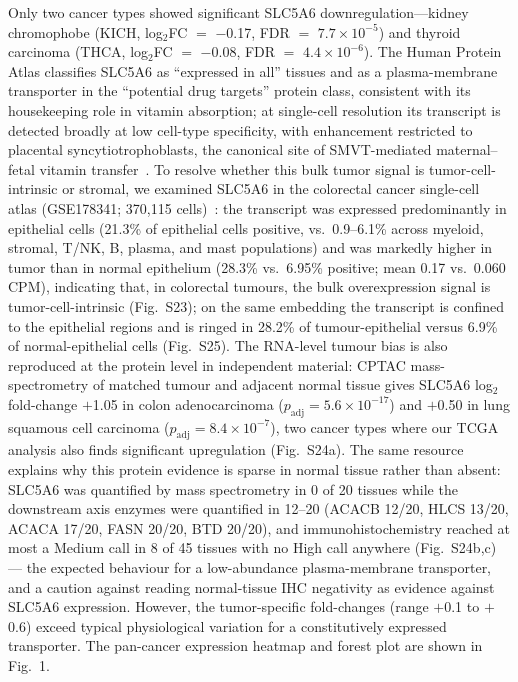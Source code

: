 \documentclass[pdflatex,sn-nature]{sn-jnl}
\begin{document}
Only two cancer types showed significant SLC5A6 downregulation---kidney chromophobe (KICH, log$_2$FC $=$ $-$0.17, FDR $=$ $7.7\times10^{-5}$) and thyroid carcinoma (THCA, log$_2$FC $=$ $-$0.08, FDR $=$ $4.4\times10^{-6}$). The Human Protein Atlas classifies SLC5A6 as ``expressed in all'' tissues and as a plasma-membrane transporter in the ``potential drug targets'' protein class, consistent with its housekeeping role in vitamin absorption; at single-cell resolution its transcript is detected broadly at low cell-type specificity, with enhancement restricted to placental syncytiotrophoblasts, the canonical site of SMVT-mediated maternal--fetal vitamin transfer~\cite{wang1999,karlsson2021}. To resolve whether this bulk tumor signal is tumor-cell-intrinsic or stromal, we examined SLC5A6 in the colorectal cancer single-cell atlas (GSE178341; 370,115 cells)~\cite{pelka2021}: the transcript was expressed predominantly in epithelial cells (21.3\% of epithelial cells positive, vs.\ 0.9--6.1\% across myeloid, stromal, T/NK, B, plasma, and mast populations) and was markedly higher in tumor than in normal epithelium (28.3\% vs.\ 6.95\% positive; mean 0.17 vs.\ 0.060 CPM), indicating that, in colorectal tumours, the bulk overexpression signal is tumor-cell-intrinsic (Fig.~S23); on the same embedding the transcript is confined to the epithelial regions and is ringed in 28.2\% of tumour-epithelial versus 6.9\% of normal-epithelial cells (Fig.~S25). The RNA-level tumour bias is also reproduced at the protein level in independent material: CPTAC mass-spectrometry of matched tumour and adjacent normal tissue gives SLC5A6 log$_2$ fold-change $+$1.05 in colon adenocarcinoma ($p_{\mathrm{adj}} = 5.6\times10^{-17}$) and $+$0.50 in lung squamous cell carcinoma ($p_{\mathrm{adj}} = 8.4\times10^{-7}$), two cancer types where our TCGA analysis also finds significant upregulation (Fig.~S24a). The same resource explains why this protein evidence is sparse in normal tissue rather than absent: SLC5A6 was quantified by mass spectrometry in 0 of 20 tissues while the downstream axis enzymes were quantified in 12--20 (ACACB 12/20, HLCS 13/20, ACACA 17/20, FASN 20/20, BTD 20/20), and immunohistochemistry reached at most a Medium call in 8 of 45 tissues with no High call anywhere (Fig.~S24b,c) --- the expected behaviour for a low-abundance plasma-membrane transporter, and a caution against reading normal-tissue IHC negativity as evidence against SLC5A6 expression. However, the tumor-specific fold-changes (range $+$0.1 to $+$0.6) exceed typical physiological variation for a constitutively expressed transporter. The pan-cancer expression heatmap and forest plot are shown in Fig.~1.
\end{document}
